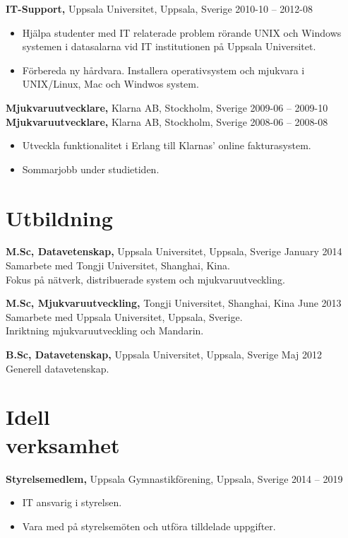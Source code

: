 \documentclass[margin]{res}
\begin{document}
\begin{resume}
{\bf IT-Support,} Uppsala Universitet, Uppsala, Sverige \hfill 2010-10 -- 2012-08
 \begin{itemize} \itemsep -2pt  %
 \item Hjälpa studenter med IT relaterade problem rörande UNIX och
   Windows systemen i datasalarna vid IT institutionen på Uppsala Universitet.
 \item Förbereda ny hårdvara. Installera operativsystem och mjukvara i UNIX/Linux, Mac och Windwos system.
 \end{itemize}

{\bf Mjukvaruutvecklare,} Klarna AB, Stockholm, Sverige \hfill 2009-06 -- 2009-10\\
{\bf Mjukvaruutvecklare,} Klarna AB, Stockholm, Sverige \hfill 2008-06 -- 2008-08
\begin{itemize} \itemsep -2pt  %
\item Utveckla funktionalitet i Erlang till Klarnas' online fakturasystem.
\item Sommarjobb under studietiden.
\end{itemize}

\section{Utbildning}
{\bf M.Sc,  Datavetenskap,} Uppsala Universitet, Uppsala, Sverige \hfill January 2014 \\
Samarbete med Tongji Universitet, Shanghai, Kina. \\
Fokus på nätverk, distribuerade system och mjukvaruutveckling.

{\bf M.Sc, Mjukvaruutveckling,} Tongji Universitet, Shanghai, Kina \hfill June 2013 \\
Samarbete med Uppsala Universitet, Uppsala, Sverige. \\
Inriktning mjukvaruutveckling och Mandarin.

{\bf B.Sc, Datavetenskap,} Uppsala Universitet, Uppsala, Sverige \hfill Maj 2012 \\
Generell datavetenskap.

\newpage
\section{Idell \\ verksamhet}

{\bf Styrelsemedlem,} Uppsala Gymnastikförening, Uppsala, Sverige \hfill 2014 -- 2019
\begin{itemize} \itemsep -2pt
\item IT ansvarig i styrelsen.
\item Vara med på styrelsemöten och utföra tilldelade uppgifter.
\end{itemize}


\end{resume}
\end{document}
